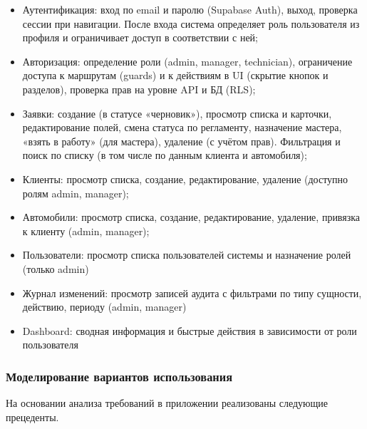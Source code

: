 \begin{itemize}
	\item Аутентификация: вход по email и паролю (Supabase Auth), выход, проверка сессии при навигации. После входа система определяет роль пользователя из профиля и ограничивает доступ в соответствии с ней;
	\item Авторизация: определение роли (admin, manager, technician), ограничение доступа к маршрутам (guards) и к действиям в UI (скрытие кнопок и разделов), проверка прав на уровне API и БД (RLS);
	\item Заявки: создание (в статусе «черновик»), просмотр списка и карточки, редактирование полей, смена статуса по регламенту, назначение мастера, «взять в работу» (для мастера), удаление (с учётом прав). Фильтрация и поиск по списку (в том числе по данным клиента и автомобиля);
	\item Клиенты: просмотр списка, создание, редактирование, удаление (доступно ролям admin, manager);
	\item Автомобили: просмотр списка, создание, редактирование, удаление, привязка к клиенту (admin, manager);
	\item Пользователи: просмотр списка пользователей системы и назначение ролей (только admin)
	\item Журнал изменений: просмотр записей аудита с фильтрами по типу сущности, действию, периоду (admin, manager)
	\item Dashboard: сводная информация и быстрые действия в зависимости от роли пользователя
\end{itemize}

\subsubsection{Моделирование вариантов использования}

На основании анализа требований в приложении реализованы следующие прецеденты.

